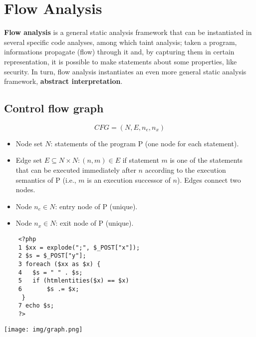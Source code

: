 \documentclass[a4paper, 10pt, titlepage]{article}
\begin{document}
\newpage
\section{Flow Analysis}
\textbf{Flow analysis} is a general static analysis framework that can be instantiated in several specific code analyses, among which taint analysis; taken a program, informations propagate (flow) through it and, by capturing them in certain representation, it is possible to make statements about some properties, like security.
In turn, flow analysis instantiates an even more general static analysis framework, \textbf{abstract interpretation}. 

\subsection{Control flow graph}
$$CFG = (N, E, n_e, n_x)$$
\begin{itemize}
\item Node set $N$: statements of the program P (one node for each statement).
\item Edge set $E \subseteq N \times N:(n, m) \in E$ if statement $m$ is one of the statements that can be executed immediately after $n$ according to the execution semantics of P (i.e., $m$ is an execution successor of $n$). Edges connect two nodes.
\item Node $n_e \in N$: entry node of P (unique).
\item Node $n_x \in N$: exit node of P (unique).
\end{itemize}
\begin{minipage}{0.6\textwidth}
\begin{lstlisting}
	<?php
	1 $xx = explode(";", $_POST["x"]);
	2 $s = $_POST["y"];
	3 foreach ($xx as $x) {
	4	$s = " " . $s;
	5	if (htmlentities($x) == $x)
	6		$s .= $x;
 	 }
	7 echo $s;
	?>
\end{lstlisting}
\end{minipage}
\begin{minipage}{0.35\textwidth}
\texttt{[image: img/graph.png]}
\end{minipage}
\end{document}
